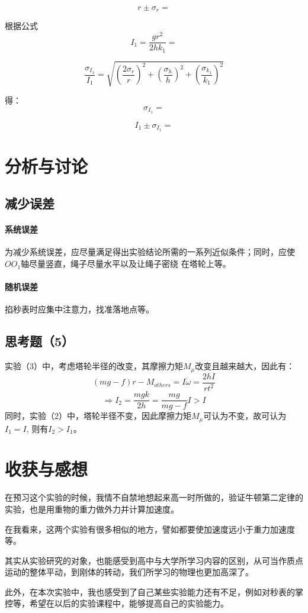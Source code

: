 \documentclass{ctexart}
\begin{document}
      $$r\pm\sigma_r=$$

      根据公式$$I_1=\frac{gr^2}{2hk_1}=$$

      $$\frac{\sigma_{I_1}}{I_1}=\sqrt{(\frac{2\sigma_r}{r})^2+(\frac{\sigma_h}{h})^2+(\frac{\sigma_{k_1}}{k_1})^2}$$

      得：$$\sigma_{I_1}=$$

      $$I_1\pm\sigma_{I_1}=$$
      
      \section{分析与讨论}
      \subsection{减少误差}
      \paragraph{系统误差}为减少系统误差，应尽量满足得出实验结论所需的一系列近似条件；同时，应使$OO_1$轴尽量竖直，绳子尽量水平以及让绳子密绕
      在塔轮上等。
      \paragraph{随机误差}掐秒表时应集中注意力，找准落地点等。
      \subsection{思考题（5）}
      实验（3）中，考虑塔轮半径的改变，其摩擦力矩$M_{\mu}$改变且越来越大，因此有：
      $$(mg-f)r-M_{others}=I\dot\omega=\frac{2hI}{rt^2}$$
      $$\Rightarrow I_2=\frac{mgk}{2h}=\frac{mg}{mg-f}I>I$$
      同时，实验（2）中，塔轮半径不变，因此摩擦力矩$M_{\mu}$可认为不变，故可认为$I_1=I$,
      则有$I_2>I_1$。
      \section{收获与感想}
      在预习这个实验的时候，我情不自禁地想起来高一时所做的，验证牛顿第二定律的实验，也是用重物的重力做外力并计算加速度。

      在我看来，这两个实验有很多相似的地方，譬如都要使加速度远小于重力加速度等。

      其实从实验研究的对象，也能感受到高中与大学所学习内容的区别，从可当作质点运动的整体平动，到刚体的转动，我们所学习的物理也更加高深了。

      此外，在本次实验中，我也感受到了自己某些实验能力还有不足，例如对秒表的掌控等，希望在以后的实验课程中，能够提高自己的实验能力。
\end{document}

